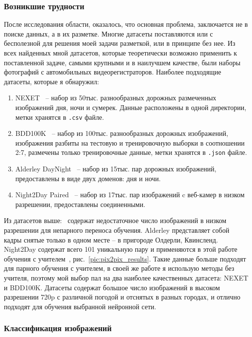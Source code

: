 \documentclass[11pt,a4paper]{extarticle}
\begin{document}
{		\subsubsection*{Возникшие трудности}\label{sec:difficulties}
		После исследования области, оказалось, что основная проблема, заключается не в поиске данных, а в их разметке. Многие датасеты поставляются или с бесполезной для решения моей задачи разметкой, или в принципе без нее.
		Из всех найденных мной датасетов, которые теоретически возможно применить к поставленной задаче, самыми крупными и в наилучшем качестве, были наборы фотографий с автомобильных видеорегистраторов.
		Наиболее подходящие датасеты, которые я обнаружил: 
		
		\begin{enumerate}
			\item NEXET~\cite{data:nexet} -- набор из 50тыс. разнообразных дорожных размеченных изображений дня, ночи и сумерек. Данные расположены в одной директории, метки хранятся в \texttt{.csv} файле.
			\item BDD100K~\cite{data:bdd100k} -- набор из 100тыс. разнообразных дорожных изображений, изображения разбиты на тестовую и тренировочную выборки в соотношении 2:7, размечены только тренировочные данные, метки хранятся в \texttt{.json} файле.
			\item Alderley DayNight~\cite{data:alderley} -- набор из 15тыс. пар дорожных изображений, предоставлены в виде двух доменов: дня и ночи. 
			\item Night2Day Paired~\cite{data:paired_night2day} -- набор из 17тыс. пар изображений c веб-камер в низком разрешении, предоставлены соединенными.
		\end{enumerate}
		\noindent
		Из датасетов выше:~\cite{data:alderley,data:paired_night2day} содержат недостаточное число изображений в низком разрешении для непарного переноса обучения. Alderley представляет собой кадры снятые только в одном месте -- в пригороде Олдерли, Квинсленд.
		Night2Day содержат всего 101 уникальную пару и применяются в этой работе обучения с учителем~\cite{pix2pix}, рис.~\ref{pic:pix2pix_results}.
		Такие данные больше подходят для парного обучения с учителем, в своей же работе я использую методы без учителя, поэтому мой выбор пал на два наиболее качественных датасета: NEXET и BDD100K.
		Датасеты содержат большое число изображений в высоком разрешении 720p с различной погодой и отснятых в разных городах, и отлично подходят для обучения выбранной нейронной сети.
		
		\subsubsection*{Классификация изображений}\label{sec:classify_images}

}
\end{document}
